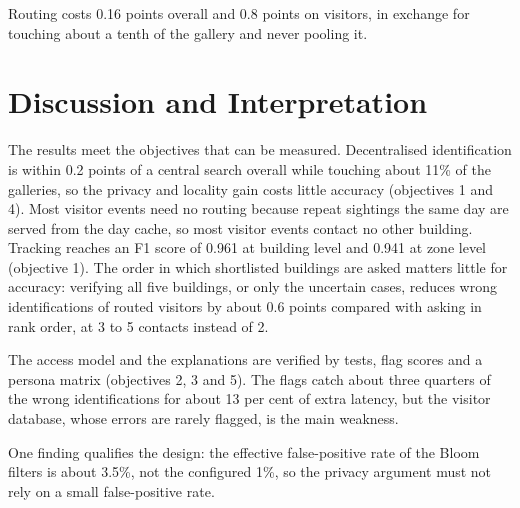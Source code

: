 \documentclass[12pt,a4paper,oneside]{report}
\begin{document}
Routing costs 0.16 points overall and 0.8 points on visitors, in exchange for touching about a tenth of the gallery and never pooling it.

\section{Discussion and Interpretation}
The results meet the objectives that can be measured. Decentralised identification is within 0.2 points of a central search overall while touching about 11\% of the galleries, so the privacy and locality gain costs little accuracy (objectives 1 and 4). Most visitor events need no routing because repeat sightings the same day are served from the day cache, so most visitor events contact no other building. Tracking reaches an F1 score of 0.961 at building level and 0.941 at zone level (objective 1). The order in which shortlisted buildings are asked matters little for accuracy: verifying all five buildings, or only the uncertain cases, reduces wrong identifications of routed visitors by about 0.6 points compared with asking in rank order, at 3 to 5 contacts instead of 2.

The access model and the explanations are verified by tests, flag scores and a persona matrix (objectives 2, 3 and 5). The flags catch about three quarters of the wrong identifications for about 13 per cent of extra latency, but the visitor database, whose errors are rarely flagged, is the main weakness.

One finding qualifies the design: the effective false-positive rate of the Bloom filters is about 3.5\%, not the configured 1\%, so the privacy argument must not rely on a small false-positive rate.
\end{document}
